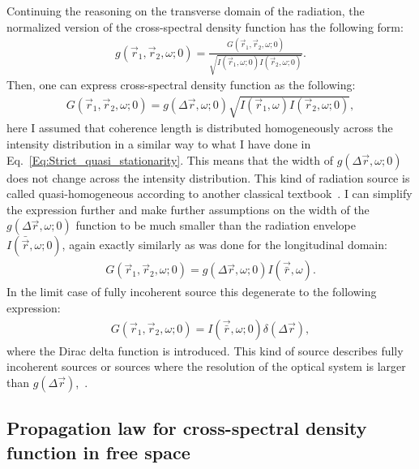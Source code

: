     Continuing the reasoning on the transverse domain of the radiation, the normalized version of the cross-spectral density function has the following form:
    \begin{align}
        g(\vec{r}_1, \vec{r}_2, \omega; 0) = \frac{G(\vec{r}_1, \vec{r}_2, \omega; 0)}{\sqrt{I(\vec{r}_1, \omega; 0)I(\vec{r}_2, \omega; 0)}}.
    \end{align}
    Then, one can express cross-spectral density function as the following:
    \begin{align}
        G(\vec{r}_1, \vec{r}_2, \omega; 0) =  g(\Delta \vec{r}, \omega; 0){\sqrt{I(\vec{r}_1, \omega)I(\vec{r}_2, \omega; 0)}},
        \label{Eq:quasi_homogeneous_source_strong}
    \end{align}
    here I assumed that coherence length is distributed homogeneously across the intensity distribution in a similar way to what I have done in Eq.~\ref{Eq:Strict_quasi_stationarity}. This means that the width of $g(\Delta \vec{r}, \omega; 0)$ does not change across the intensity distribution. This kind of radiation source is called quasi-homogeneous according to another classical textbook~\cite{goodman_statistical_2015}. I can simplify the expression further and make further assumptions on the width of the $g(\Delta \vec{r}, \omega; 0)$ function to be much smaller than the radiation envelope $I(\bar{\vec{r}}, \omega; 0)$, again exactly similarly as was done for the longitudinal domain:
    \begin{align}
        G(\vec{r}_1, \vec{r}_2, \omega; 0) =  g(\Delta \vec{r}, \omega; 0)I(\vec{\bar{r}}, \omega).
        \label{Eq:quasi_homogeneous_source_weak}
    \end{align}
    In the limit case of fully incoherent source this degenerate to the following expression:
    \begin{align}
        G(\vec{r}_1, \vec{r}_2, \omega; 0) =  I(\vec{\bar{r}}, \omega; 0)\delta(\Delta \vec{r}),
        \label{Eq:incoherent_source}        
    \end{align}
    where the Dirac delta function is introduced. This kind of source describes fully incoherent sources or sources where the resolution of the optical system is larger than $g(\Delta \vec{r})$,~\cite{goodman_statistical_2015}.
    
\subsection{Propagation law for cross-spectral density function in free space}

